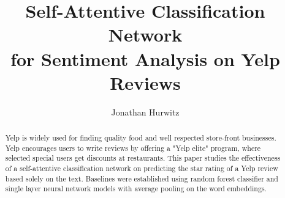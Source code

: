 \documentclass[sigconf]{acmart}
\begin{document}
\title{Self-Attentive Classification Network \\ for Sentiment Analysis on Yelp Reviews}


\author{Jonathan Hurwitz}





\begin{abstract}
Yelp is widely used for finding quality food and well respected store-front businesses. Yelp encourages users to write reviews by offering a "Yelp elite" program, where selected special users get discounts at restaurants. This paper studies the effectiveness of a self-attentive classification network on predicting the star rating of a Yelp review based solely on the text. Baselines were established using random forest classifier and single layer neural network models with average pooling on the word embeddings.
\end{abstract}

%
%

\end{document}
